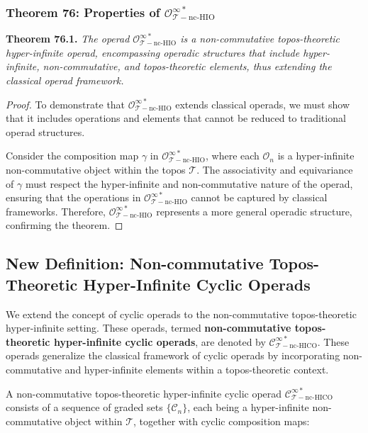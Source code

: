 \documentclass{article}
\begin{document}
\subsubsection{Theorem 76: Properties of \(\mathcal{O}_{\mathcal{T}-\text{nc-HIO}}^{\infty *}\)}
\textbf{Theorem 76.1.} \textit{The operad \(\mathcal{O}_{\mathcal{T}-\text{nc-HIO}}^{\infty *}\) is a non-commutative topos-theoretic hyper-infinite operad, encompassing operadic structures that include hyper-infinite, non-commutative, and topos-theoretic elements, thus extending the classical operad framework.}

\begin{proof}
To demonstrate that \(\mathcal{O}_{\mathcal{T}-\text{nc-HIO}}^{\infty *}\) extends classical operads, we must show that it includes operations and elements that cannot be reduced to traditional operad structures.

Consider the composition map \(\gamma\) in \(\mathcal{O}_{\mathcal{T}-\text{nc-HIO}}^{\infty *}\), where each \(\mathcal{O}_n\) is a hyper-infinite non-commutative object within the topos \(\mathcal{T}\). The associativity and equivariance of \(\gamma\) must respect the hyper-infinite and non-commutative nature of the operad, ensuring that the operations in \(\mathcal{O}_{\mathcal{T}-\text{nc-HIO}}^{\infty *}\) cannot be captured by classical frameworks. Therefore, \(\mathcal{O}_{\mathcal{T}-\text{nc-HIO}}^{\infty *}\) represents a more general operadic structure, confirming the theorem.
\end{proof}

\subsection{New Definition: Non-commutative Topos-Theoretic Hyper-Infinite Cyclic Operads}
We extend the concept of cyclic operads to the non-commutative topos-theoretic hyper-infinite setting. These operads, termed \textbf{non-commutative topos-theoretic hyper-infinite cyclic operads}, are denoted by \(\mathcal{C}_{\mathcal{T}-\text{nc-HICO}}^{\infty *}\). These operads generalize the classical framework of cyclic operads by incorporating non-commutative and hyper-infinite elements within a topos-theoretic context.

A non-commutative topos-theoretic hyper-infinite cyclic operad \(\mathcal{C}_{\mathcal{T}-\text{nc-HICO}}^{\infty *}\) consists of a sequence of graded sets \(\{\mathcal{C}_n\}\), each being a hyper-infinite non-commutative object within \(\mathcal{T}\), together with cyclic composition maps:
\end{document}
